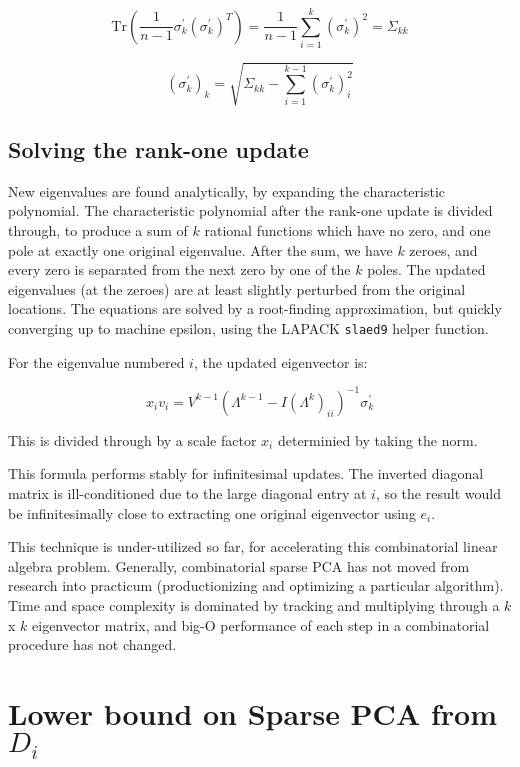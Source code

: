 \documentclass{article}
\begin{document}
$$
\text{Tr}\left( \frac{1}{n-1} \sigma_k^\prime \left(\sigma_k^\prime\right)^T \right) = \frac{1}{n-1} \sum_{i=1}^k \left(\sigma_k^\prime\right)^2 = \Sigma_{kk}
$$

$$
\left(\sigma_k^\prime\right)_k = \sqrt{\Sigma_{kk} - \sum_{i=1}^{k-1} \left(\sigma_k^\prime\right)_i^2}
$$

\subsection{Solving the rank-one update}

New eigenvalues are found analytically, by expanding the characteristic polynomial. The characteristic polynomial after the rank-one update is divided through, to produce a sum of $k$ rational functions which have no zero, and one pole at exactly one original eigenvalue. After the sum, we have $k$ zeroes, and every zero is separated from the next zero by one of the $k$ poles. The updated eigenvalues (at the zeroes) are at least slightly perturbed from the original locations. The equations are solved by a root-finding approximation, but quickly converging up to machine epsilon, using the LAPACK \texttt{slaed9} helper function.

For the eigenvalue numbered $i$, the updated eigenvector is:

$$x_i v_i = V^{k-1} (\Lambda^{k-1} - I \left(\Lambda^k\right)_{ii})^{-1} \sigma_k^\prime$$

This is divided through by a scale factor $x_i$ determinied by taking the norm.

This formula performs stably for infinitesimal updates. The inverted diagonal matrix is ill-conditioned due to the large diagonal entry at $i$, so the result would be infinitesimally close to extracting one original eigenvector using $e_i$.

This technique is under-utilized so far, for accelerating this combinatorial linear algebra problem. Generally, combinatorial sparse PCA has not moved from research into practicum (productionizing and optimizing a particular algorithm). Time and space complexity is dominated by tracking and multiplying through a $k$ x $k$ eigenvector matrix, and big-O performance of each step in a combinatorial procedure has not changed.

\section{Lower bound on Sparse PCA from $D_i$}
\end{document}
